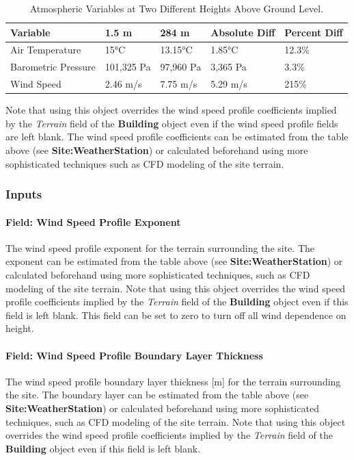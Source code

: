 \begin{longtable}[c]{@{}lllll@{}}
\caption{Atmospheric Variables at Two Different Heights Above Ground Level. \protect \label{table:atmospheric-variables-at-two-different}}\\
\toprule 
Variable & 1.5 m & 284 m & Absolute Diff & Percent Diff \tabularnewline \midrule
\endhead
Air Temperature & 15°C & 13.15°C & 1.85°C & 12.3\% \tabularnewline
Barometric Pressure & 101,325 Pa & 97,960 Pa & 3,365 Pa & 3.3\% \tabularnewline
Wind Speed & 2.46 m/s & 7.75 m/s & 5.29 m/s & 215\% \tabularnewline
\bottomrule
\end{longtable}

Note that using this object overrides the wind speed profile coefficients implied by the \emph{Terrain} field of the \textbf{Building} object even if the wind speed profile fields are left blank. The wind speed profile coefficients can be estimated from the table above (see \textbf{Site:WeatherStation}) or calculated beforehand using more sophisticated techniques such as CFD modeling of the site terrain.

\subsubsection{Inputs}\label{inputs-10-009}

\paragraph{Field: Wind Speed Profile Exponent}\label{field-wind-speed-profile-exponent-1}

The wind speed profile exponent for the terrain surrounding the site. The exponent can be estimated from the table above (see \textbf{Site:WeatherStation}) or calculated beforehand using more sophisticated techniques, such as CFD modeling of the site terrain. Note that using this object overrides the wind speed profile coefficients implied by the \emph{Terrain} field of the \textbf{Building} object even if this field is left blank. This field can be set to zero to turn off all wind dependence on height.

\paragraph{Field: Wind Speed Profile Boundary Layer Thickness}\label{field-wind-speed-profile-boundary-layer-thickness-1}

The wind speed profile boundary layer thickness {[}m{]} for the terrain surrounding the site. The boundary layer can be estimated from the table above (see \textbf{Site:WeatherStation}) or calculated beforehand using more sophisticated techniques, such as CFD modeling of the site terrain. Note that using this object overrides the wind speed profile coefficients implied by the \emph{Terrain} field of the \textbf{Building} object even if this field is left blank.

